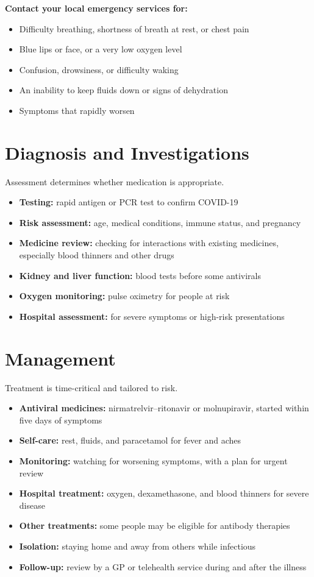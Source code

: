 \textbf{Contact your local emergency services for:}
\begin{itemize}
    \item Difficulty breathing, shortness of breath at rest, or chest pain
    \item Blue lips or face, or a very low oxygen level
    \item Confusion, drowsiness, or difficulty waking
    \item An inability to keep fluids down or signs of dehydration
    \item Symptoms that rapidly worsen
\end{itemize}

\section*{Diagnosis and Investigations}
Assessment determines whether medication is appropriate.

\begin{itemize}
    \item \textbf{Testing:} rapid antigen or PCR test to confirm COVID-19
    \item \textbf{Risk assessment:} age, medical conditions, immune status, and pregnancy
    \item \textbf{Medicine review:} checking for interactions with existing medicines, especially blood thinners and other drugs
    \item \textbf{Kidney and liver function:} blood tests before some antivirals
    \item \textbf{Oxygen monitoring:} pulse oximetry for people at risk
    \item \textbf{Hospital assessment:} for severe symptoms or high-risk presentations
\end{itemize}

\section*{Management}
Treatment is time-critical and tailored to risk.

\begin{itemize}
    \item \textbf{Antiviral medicines:} nirmatrelvir--ritonavir or molnupiravir, started within five days of symptoms
    \item \textbf{Self-care:} rest, fluids, and paracetamol for fever and aches
    \item \textbf{Monitoring:} watching for worsening symptoms, with a plan for urgent review
    \item \textbf{Hospital treatment:} oxygen, dexamethasone, and blood thinners for severe disease
    \item \textbf{Other treatments:} some people may be eligible for antibody therapies
    \item \textbf{Isolation:} staying home and away from others while infectious
    \item \textbf{Follow-up:} review by a GP or telehealth service during and after the illness
\end{itemize}


